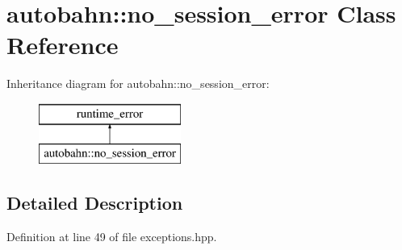\hypertarget{classautobahn_1_1no__session__error}{}\section{autobahn\+:\+:no\+\_\+session\+\_\+error Class Reference}
\label{classautobahn_1_1no__session__error}
Inheritance diagram for autobahn\+:\+:no\+\_\+session\+\_\+error\+:\begin{figure}[H]
\begin{center}
\leavevmode
\includegraphics[height=2.000000cm]{classautobahn_1_1no__session__error}
\end{center}
\end{figure}


\subsection{Detailed Description}


Definition at line 49 of file exceptions.\+hpp.


